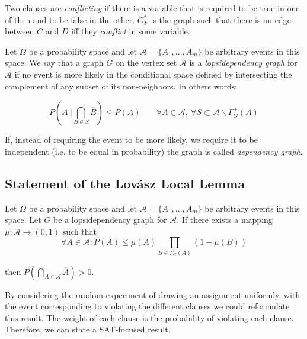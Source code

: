 \begin{definition}
	
	Two clauses are \emph{conflicting} if there is a variable that is required to be true in one of then and to be false in the other. $G_F^*$ is the graph such that there is an edge between $C$ and $D$ iff they \emph{conflict} in some variable.
	
\end{definition}
	



\begin{definition} Let $\Omega$ be a probability space and let 
$\mathcal{A} = \{A_1,...,A_m\}$ be arbitrary events in this space. We say that a graph $G$ on the vertex set $\mathcal{A}$ is a \emph{lopsidependency graph }for $\mathcal{A}$ if no event is more likely in the conditional space defined by intersecting the complement of any subset of its non-neighbors. In others words:

\[
 P\left(  A\ \Big | \bigcap_{B\in S} \overline{B} \right ) \le P(A) \ \ \ \ \quad \forall A \in \mathcal{A},\ \forall S \subset \mathcal{A} \backslash\Gamma_G^+(A) 
\]


If, instead of requiring the event to be more likely, we require it to be independent (i.e. to be equal in probability) the graph is called \emph{dependency graph}.

\end{definition}

\subsection{Statement of the Lovász Local Lemma}

\begin{theorem}\label{LLL}
	Let $\Omega$ be a probability space and let 
$\mathcal{A} = \{A_1,...,A_m\}$ be arbitrary events in this space. Let $G$ be a lopsidependency graph for $\mathcal{A}$. If there exists a mapping $\mu:\mathcal{A} \to (0,1)$ such that 
$$
\forall A \in \mathcal{A} : P (A) \le \mu(A) \prod_{B\in\Gamma_G(A)} (1-\mu(B))
$$

then $P\left ( \bigcap_{A\in \mathcal{A}} \overline{A}\right ) > 0$.\\
\end{theorem}

By considering the random experiment of drawing an assignment uniformly, with the event corresponding to violating the different clauses we could reformulate this result. The weight of each clause is the probability of violating each clause. Therefore, we can state a SAT-focused result.

